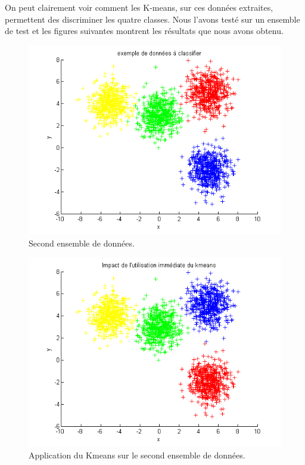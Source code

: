 On peut clairement voir comment les K-means, sur ces données extraites, permettent des discriminer les quatre classes. Nous l'avons testé sur un ensemble de test et les figures suivantes montrent les résultats que nous avons obtenu.


\begin{figure}[H]
\centering
    \includegraphics[scale=0.6,angle=0]{Images/DataSet2.png}
    \caption{Second ensemble de données.}
    \label{fig:DataSet2}
\end{figure}

\begin{figure}[H]
\centering
    \includegraphics[scale=0.6,angle=0]{Images/AlgoKmeans2.png}
    \caption{Application du Kmeans sur le second ensemble de données.}
    \label{fig:AlgoKmeans2}
\end{figure}


